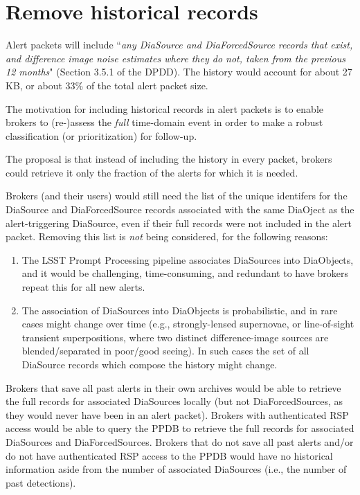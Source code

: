 \documentclass[DM,authoryear,toc]{lsstdoc}
\begin{document}
\section{Remove historical records}\label{sec:histories}

Alert packets will include ``\textit{any DiaSource and DiaForcedSource records that exist, and difference image noise
estimates where they do not, taken from the previous 12 months}" (Section 3.5.1 of the DPDD).
The history would account for about 27 KB, or about 33\% of the total alert packet size.

The motivation for including historical records in alert packets is to enable brokers to (re-)assess the \emph{full} time-domain event in order to make a robust classification (or prioritization) for follow-up.

The proposal is that instead of including the history in every packet, brokers could retrieve it only the fraction of the alerts for which it is needed.

Brokers (and their users) would still need the list of the unique identifers for the DiaSource and DiaForcedSource records associated with the same DiaOject as the alert-triggering DiaSource, even if their full records were not included in the alert packet.
Removing this list is \emph{not} being considered, for the following reasons:

\begin{enumerate}
\item The LSST Prompt Processing pipeline associates DiaSources into DiaObjects, and it would be challenging, time-consuming, and redundant to have brokers repeat this for all new alerts.
\item The association of DiaSources into DiaObjects is probabilistic, and in rare cases might change over time (e.g., strongly-lensed supernovae, or line-of-sight transient superpositions, where two distinct difference-image sources are blended/separated in poor/good seeing). In such cases the set of all DiaSource records which compose the history might change.
\end{enumerate}

Brokers that save all past alerts in their own archives would be able to retrieve the full records for associated DiaSources locally (but not DiaForcedSources, as they would never have been in an alert packet).
Brokers with authenticated RSP access would be able to query the PPDB to retrieve the full records for associated DiaSources and DiaForcedSources.
Brokers that do not save all past alerts and/or do not have authenticated RSP access to the PPDB would have no historical information aside from the number of associated DiaSources (i.e., the number of past detections).
\end{document}
